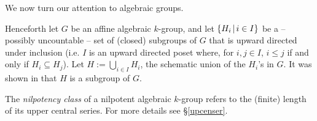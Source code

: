\documentclass[twoside,a4paper,reqno,11pt]{amsart}
\theoremstyle{definition}
\begin{document}
\noindent We now turn our attention to algebraic groups.

\vspace{2mm}\noindent Henceforth let $G$ be an affine algebraic $k$-group, and let $\{H_i \hspace{0.5mm}|\hspace{0.5mm} i\in I\}$ be a -- possibly uncountable -- set of (closed) subgroups of $G$ that is upward directed under inclusion (i.e. $I$ is an upward directed poset where, for $i,j\in I$, $i\leq j$ if and only if $H_i\subseteq H_j$). Let $H:=\bigcup_{i\in I}H_i$, the schematic union of the $H_i$'s in $G$. It was shown in \cite[Prop.\ 2.2]{S} that $H$ is a subgroup of $G$.

\vspace{2mm}\noindent The \textit{nilpotency class} of a nilpotent algebraic $k$-group refers to the (finite) length of its upper central series. For more details see \S\ref{upcenser}.
\end{document}
